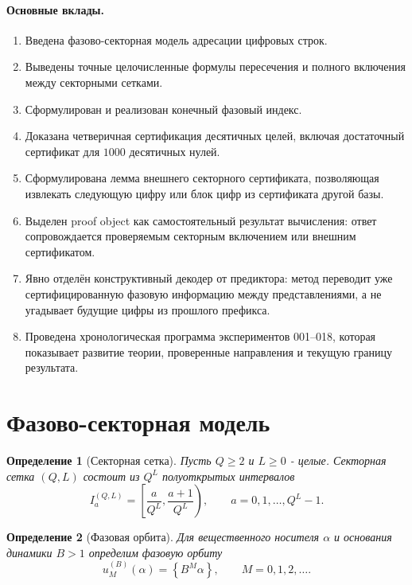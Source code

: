 \documentclass[11pt,a4paper]{article}
\newtheorem{definition}{Определение}
\newcommand{\fracpart}[1]{\left\{#1\right\}}
\begin{document}
\paragraph{Основные вклады.}
\begin{enumerate}[leftmargin=2em]
  \item Введена фазово-секторная модель адресации цифровых строк.
  \item Выведены точные целочисленные формулы пересечения и полного включения между секторными сетками.
  \item Сформулирован и реализован конечный фазовый индекс.
  \item Доказана четверичная сертификация десятичных целей, включая достаточный сертификат для $1000$ десятичных нулей.
  \item Сформулирована лемма внешнего секторного сертификата, позволяющая извлекать следующую цифру или блок цифр из сертификата другой базы.
  \item Выделен proof object как самостоятельный результат вычисления: ответ сопровождается проверяемым секторным включением или внешним сертификатом.
  \item Явно отделён конструктивный декодер от предиктора: метод переводит уже сертифицированную фазовую информацию между представлениями, а не угадывает будущие цифры из прошлого префикса.
  \item Проведена хронологическая программа экспериментов 001--018, которая показывает развитие теории, проверенные направления и текущую границу результата.
\end{enumerate}

\section{Фазово-секторная модель}

\begin{definition}[Секторная сетка]
Пусть $Q\ge2$ и $L\ge0$ - целые.  Секторная сетка $(Q,L)$ состоит из $Q^L$ полуоткрытых интервалов
\[
  I_a^{(Q,L)}=\left[\frac{a}{Q^L},\frac{a+1}{Q^L}\right),
  \qquad a=0,1,\dots,Q^L-1.
\]
\end{definition}

\begin{definition}[Фазовая орбита]
Для вещественного носителя $\alpha$ и основания динамики $B>1$ определим фазовую орбиту
\[
  u_M^{(B)}(\alpha)=\fracpart{B^M\alpha},\qquad M=0,1,2,\dots.
\]
\end{definition}
\end{document}
